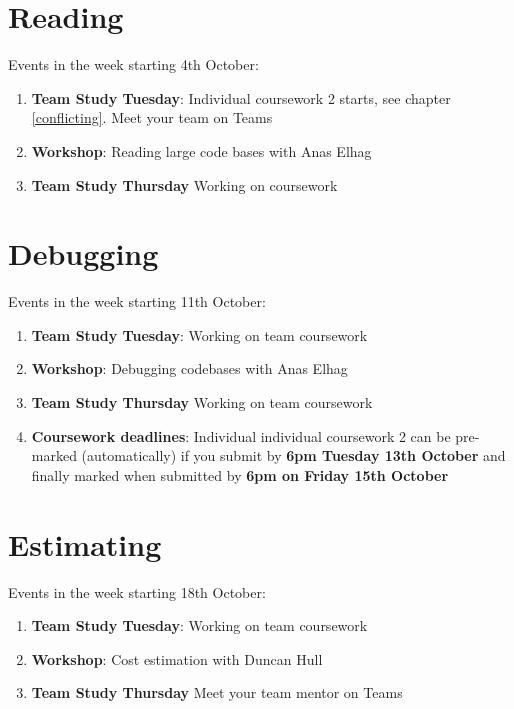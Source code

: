 \documentclass[
]{book}
\providecommand{\tightlist}{%
  \setlength{\itemsep}{0pt}\setlength{\parskip}{0pt}}
\begin{document}
\hypertarget{week2}{%
\section{Reading}\label{week2}}

Events in the week starting 4th October:

\begin{enumerate}
\def\labelenumi{\arabic{enumi}.}
\tightlist
\item
  \textbf{Team Study Tuesday}: Individual coursework 2 starts, see chapter \ref{conflicting}. Meet your team on Teams
\item
  \textbf{Workshop}: Reading large code bases with Anas Elhag
\item
  \textbf{Team Study Thursday} Working on coursework
\end{enumerate}

\hypertarget{week3}{%
\section{Debugging}\label{week3}}

Events in the week starting 11th October:

\begin{enumerate}
\def\labelenumi{\arabic{enumi}.}
\tightlist
\item
  \textbf{Team Study Tuesday}: Working on team coursework
\item
  \textbf{Workshop}: Debugging codebases with Anas Elhag
\item
  \textbf{Team Study Thursday} Working on team coursework
\item
  \textbf{Coursework deadlines}: Individual individual coursework 2 can be pre-marked (automatically) if you submit by \textbf{6pm Tuesday 13th October} and finally marked when submitted by \textbf{6pm on Friday 15th October}
\end{enumerate}

\hypertarget{week4}{%
\section{Estimating}\label{week4}}

Events in the week starting 18th October:

\begin{enumerate}
\def\labelenumi{\arabic{enumi}.}
\tightlist
\item
  \textbf{Team Study Tuesday}: Working on team coursework
\item
  \textbf{Workshop}: Cost estimation with Duncan Hull
\item
  \textbf{Team Study Thursday} Meet your team mentor on Teams
\end{enumerate}
\end{document}
